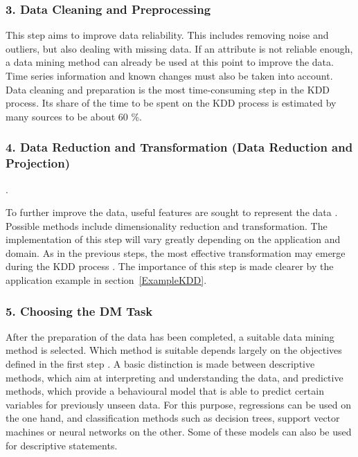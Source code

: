 \subsubsection{3. Data Cleaning and Preprocessing}

This step aims to improve data reliability. This includes removing noise and outliers, but also dealing with missing data. If an attribute is not reliable enough, a data mining method can already be used at this point to improve the data.\cite{Maimon:2010} Time series information and known changes must also be taken into account. \cite{Kurgan:2006} Data cleaning and preparation is the most time-consuming step in the KDD process. Its share of the time to be spent on the KDD process is estimated by many sources to be about 60 \%.\cite{Kurgan:2006}

\subsubsection{4. Data Reduction and Transformation (Data Reduction and Projection)}.

To further improve the data, useful features are sought to represent the data \cite{Fayyad:1996}. Possible methods include dimensionality reduction and transformation. The implementation of this step will vary greatly depending on the application and domain. As in the previous steps, the most effective transformation may emerge during the KDD process \cite{Maimon:2010}. The importance of this step is made clearer by the application example in section~\ref{ExampleKDD}.

\subsubsection{5. Choosing the DM Task}

After the preparation of the data has been completed, a suitable data mining method is selected. Which method is suitable depends largely on the objectives defined in the first step \cite{Fayyad:1996}. A basic distinction is made between descriptive methods, which aim at interpreting and understanding the data, and predictive methods, which provide a behavioural model that is able to predict certain variables for previously unseen data. For this purpose, regressions can be used on the one hand, and classification methods such as decision trees, support vector machines or neural networks on the other. Some of these models can also be used for descriptive statements. \cite{Maimon:2010}

